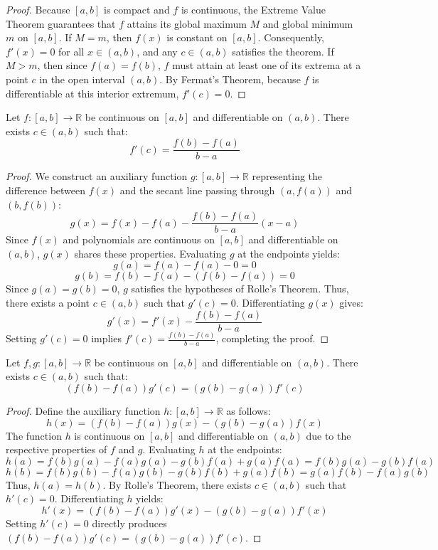\begin{proof}
Because $[a, b]$ is compact and $f$ is continuous, the Extreme Value Theorem guarantees that $f$ attains its global maximum $M$ and global minimum $m$ on $[a, b]$. 
If $M = m$, then $f(x)$ is constant on $[a, b]$. Consequently, $f'(x) = 0$ for all $x \in (a, b)$, and any $c \in (a, b)$ satisfies the theorem.
If $M > m$, then since $f(a) = f(b)$, $f$ must attain at least one of its extrema at a point $c$ in the open interval $(a, b)$. By Fermat's Theorem, because $f$ is differentiable at this interior extremum, $f'(c) = 0$.
\end{proof}

\begin{theorem}
Let $f: [a, b] \to \mathbb{R}$ be continuous on $[a, b]$ and differentiable on $(a, b)$. There exists $c \in (a, b)$ such that:
\[
f'(c) = \frac{f(b) - f(a)}{b - a}
\]
\end{theorem}

\begin{proof}
We construct an auxiliary function $g: [a, b] \to \mathbb{R}$ representing the difference between $f(x)$ and the secant line passing through $(a, f(a))$ and $(b, f(b))$:
\[
g(x) = f(x) - f(a) - \frac{f(b) - f(a)}{b - a}(x - a)
\]
Since $f(x)$ and polynomials are continuous on $[a, b]$ and differentiable on $(a, b)$, $g(x)$ shares these properties. Evaluating $g$ at the endpoints yields:
\[
g(a) = f(a) - f(a) - 0 = 0
\]
\[
g(b) = f(b) - f(a) - (f(b) - f(a)) = 0
\]
Since $g(a) = g(b) = 0$, $g$ satisfies the hypotheses of Rolle's Theorem. Thus, there exists a point $c \in (a, b)$ such that $g'(c) = 0$. Differentiating $g(x)$ gives:
\[
g'(x) = f'(x) - \frac{f(b) - f(a)}{b - a}
\]
Setting $g'(c) = 0$ implies $f'(c) = \frac{f(b) - f(a)}{b - a}$, completing the proof.
\end{proof}

\begin{theorem}
Let $f, g: [a, b] \to \mathbb{R}$ be continuous on $[a, b]$ and differentiable on $(a, b)$. There exists $c \in (a, b)$ such that:
\[
(f(b) - f(a))g'(c) = (g(b) - g(a))f'(c)
\]
\end{theorem}

\begin{proof}
Define the auxiliary function $h: [a, b] \to \mathbb{R}$ as follows:
\[
h(x) = (f(b) - f(a))g(x) - (g(b) - g(a))f(x)
\]
The function $h$ is continuous on $[a, b]$ and differentiable on $(a, b)$ due to the respective properties of $f$ and $g$. Evaluating $h$ at the endpoints:
\[
h(a) = f(b)g(a) - f(a)g(a) - g(b)f(a) + g(a)f(a) = f(b)g(a) - g(b)f(a)
\]
\[
h(b) = f(b)g(b) - f(a)g(b) - g(b)f(b) + g(a)f(b) = g(a)f(b) - f(a)g(b)
\]
Thus, $h(a) = h(b)$. By Rolle's Theorem, there exists $c \in (a, b)$ such that $h'(c) = 0$. Differentiating $h$ yields:
\[
h'(x) = (f(b) - f(a))g'(x) - (g(b) - g(a))f'(x)
\]
Setting $h'(c) = 0$ directly produces $(f(b) - f(a))g'(c) = (g(b) - g(a))f'(c)$.
\end{proof}

